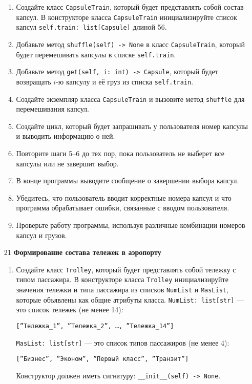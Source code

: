 \begin{enumerate}
\begin{enumerate}
    \item Создайте класс \texttt{CapsuleTrain}, который будет представлять собой состав капсул. В конструкторе класса \texttt{CapsuleTrain} инициализируйте список капсул \texttt{self.train: list[Capsule]} длиной 56.

    \item Добавьте метод \texttt{shuffle(self) -> None} в класс \texttt{CapsuleTrain}, который будет перемешивать капсулы в списке \texttt{self.train}.

    \item Добавьте метод \texttt{get(self, i: int) -> Capsule}, который будет возвращать $i$-ю капсулу и её груз из списка \texttt{self.train}.

    \item Создайте экземпляр класса \texttt{CapsuleTrain} и вызовите метод \texttt{shuffle} для перемешивания капсул.

    \item Создайте цикл, который будет запрашивать у пользователя номер капсулы и выводить информацию о ней.

    \item Повторите шаги 5–6 до тех пор, пока пользователь не выберет все капсулы или не завершит выбор.

    \item В конце программы выводите сообщение о завершении выбора капсул.

    \item Убедитесь, что пользователь вводит корректные номера капсул и что программа обрабатывает ошибки, связанные с вводом пользователя.

    \item Проверьте работу программы, используя различные комбинации номеров капсул и грузов.
\end{enumerate}

\item[21] \textbf{Формирование состава тележек в аэропорту}
\begin{enumerate}
    \item Создайте класс \texttt{Trolley}, который будет представлять собой тележку с типом пассажира. В конструкторе класса \texttt{Trolley} инициализируйте значения тележки и типа пассажира из списков \texttt{NumList} и \texttt{MasList}, которые объявлены как общие атрибуты класса. \texttt{NumList: list[str]} — это список тележек (не менее 14): 
    \begin{center}
        \texttt{[''Тележка\_1'', ''Тележка\_2'', \dots, ''Тележка\_14'']}
    \end{center}
    \texttt{MasList: list[str]} — это список типов пассажиров (не менее 4):
    \begin{center}
        \texttt{[''Бизнес'', ''Эконом'', ''Первый класс'', ''Транзит'']}
    \end{center}
    Конструктор должен иметь сигнатуру: \texttt{\_\_init\_\_(self) -> None}.


\end{enumerate}
\end{enumerate}
